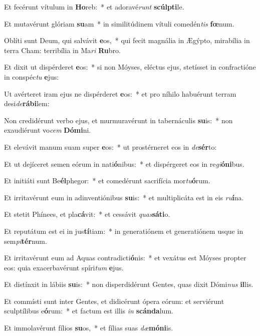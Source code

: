 \item Et fecérunt vítulum in \textbf{Ho}reb:~* et adoravé\textit{runt} \textbf{scúlp}\textbf{ti}le.
\item Et mutavérunt glóriam \textbf{su}am~* in similitúdinem vítuli comedén\textit{tis} \textbf{fœ}num.
\item Oblíti sunt Deum, qui salvávit \textbf{e}os,~* qui fecit magnália in Ægýpto, mirabília in terra Cham: terribília in Ma\textit{ri} \textbf{Ru}bro.
\item Et dixit ut dispérderet \textbf{e}os:~* si non Móyses, eléctus ejus, stetísset in confractióne in conspéc\textit{tu} \textbf{e}jus:
\item Ut avérteret iram ejus ne dispérderet \textbf{e}os:~* et pro níhilo habuérunt terram desi\textit{de}\textbf{rá}\textbf{bi}lem:
\item Non credidérunt verbo ejus, et murmuravérunt in tabernáculis \textbf{su}is:~* non exaudiérunt vo\textit{cem} \textbf{Dó}\textbf{mi}ni.
\item Et elevávit manum suam super \textbf{e}os:~* ut prostérneret eos in \textit{de}\textbf{sér}to:
\item Et ut dejíceret semen eórum in nati\textbf{ó}nibus:~* et dispérgeret eos in re\textit{gi}\textbf{ó}\textbf{ni}bus.
\item Et initiáti sunt Be\textbf{él}phegor:~* et comedérunt sacrifícia mor\textit{tu}\textbf{ó}rum.
\item Et irritavérunt eum in adinventiónibus \textbf{su}is:~* et multiplicáta est in eis \textit{ru}\textbf{í}na.
\item Et stetit Phínees, et pla\textbf{cá}vit:~* et cessávit \textit{quas}\textbf{sá}\textbf{ti}o.
\item Et reputátum est ei in jus\textbf{tí}tiam:~* in generatiónem et generatiónem usque in sem\textit{pi}\textbf{tér}num.
\item Et irritavérunt eum ad Aquas contradicti\textbf{ó}nis:~* et vexátus est Móyses propter eos: quia exacerbavérunt spíri\textit{tum} \textbf{e}jus.
\item Et distínxit in lábiis \textbf{su}is:~* non disperdidérunt Gentes, quas dixit Dómi\textit{nus} \textbf{il}lis.
\item Et commísti sunt inter Gentes, et didicérunt ópera eórum: et serviérunt sculptílibus e\textbf{ó}rum:~* et factum est illis \textit{in} \textbf{scán}\textbf{da}lum.
\item Et immolavérunt fílios \textbf{su}os,~* et fílias suas \textit{dæ}\textbf{mó}\textbf{ni}is.
